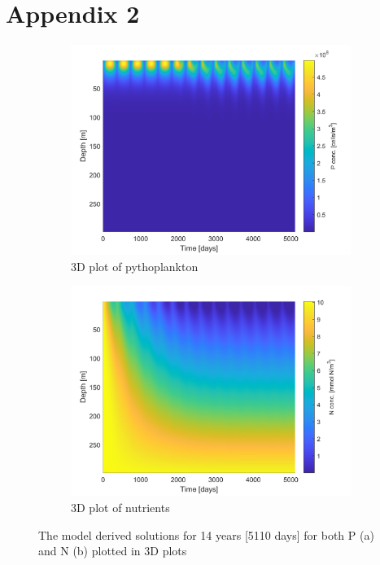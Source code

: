 \section{Appendix 2}
\begin{figure}[!htb]
\centering
\begin{subfigure}{.8\textwidth}
  \centering
  \includegraphics[width=\linewidth]{Pictures/Baserun_P.png}
  \caption{3D plot of pythoplankton}
  \label{fig:baserunP}
\end{subfigure}%

\begin{subfigure}{.8\textwidth}
  \centering
  \includegraphics[width=\linewidth]{Pictures/Baserun_N.png}
  \caption{3D plot of nutrients}
  \label{fig:baserunN}
\end{subfigure}
\caption{The model derived solutions for 14 years [5110 days] for both P (a) and N (b) plotted in 3D plots}
\label{fig:baserunplots}
\end{figure}

